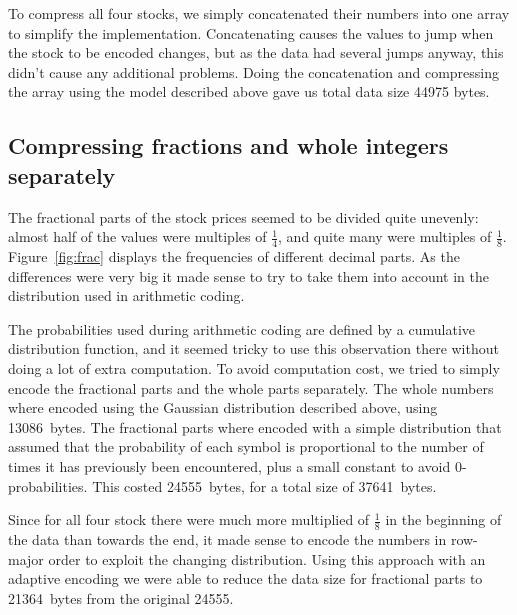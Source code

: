 \documentclass{article}
\begin{document}
To compress all four stocks, we simply concatenated their numbers into one array to simplify the implementation.
Concatenating causes the values to jump when the stock to be encoded changes, but as the data had several jumps anyway, this didn't cause any additional problems.
Doing the concatenation and compressing the array using the model described above gave us total data size 44975 bytes.

\subsection{Compressing fractions and whole integers separately}

The fractional parts of the stock prices seemed to be divided quite unevenly: almost half of the values were multiples of $\frac{1}{4}$, and quite many were multiples of $\frac{1}{8}$.
Figure~\ref{fig:frac} displays the frequencies of different decimal parts.
As the differences were very big it made sense to try to take them into account in the distribution used in arithmetic coding.

The probabilities used during arithmetic coding are defined by a cumulative distribution function, and it seemed tricky to use this observation there without doing a lot of extra computation.
To avoid computation cost, we tried to simply encode the fractional parts and the whole parts separately.
The whole numbers where encoded using the Gaussian distribution described above, using 13086~bytes.
The fractional parts where encoded with a simple distribution that assumed that the probability of each symbol is proportional to the number of times it has previously been encountered, plus a small constant to avoid 0-probabilities.
This costed 24555~bytes, for a total size of 37641~bytes.

Since for all four stock there were much more multiplied of $\frac{1}{8}$ in the beginning of the data than towards the end, it made sense to encode the numbers in row-major order to exploit the changing distribution.
Using this approach with an adaptive encoding we were able to reduce the data size for fractional parts to 21364~bytes from the original 24555.
\end{document}
